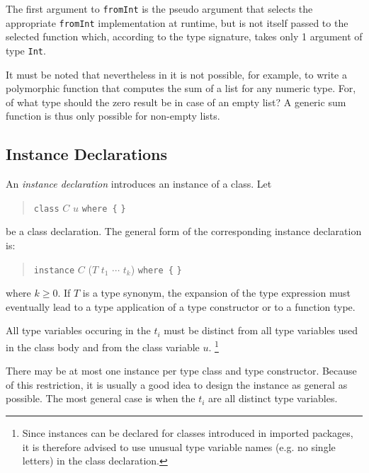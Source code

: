 The first argument to \texttt{fromInt} is the pseudo argument that selects the appropriate \texttt{fromInt} implementation at runtime, but is not itself passed to the selected function which, according to the type signature, takes only 1 argument of type \texttt{Int}.

It must be noted that nevertheless in \frege{} it is not possible, for example, to write a polymorphic function that computes the sum of a list for any numeric type. For, of what type should the zero result be in case of an empty list? A generic sum function is thus only possible for non-empty lists.

\subsection{Instance Declarations} \label{instdcl}  

\begin{flushleft}
    
\end{flushleft}

An \emph{instance declaration} introduces an instance of a class. Let
\begin{quote}
\texttt{class} $C$ $u$ \texttt{where \{}  \texttt{\}}
\end{quote}
be a class declaration.
The general form of the corresponding instance declaration is:
\begin{quote}
\texttt{instance} $C$ ($T$ $t_1$ $\cdots$ $t_k$) \texttt{where \{}  \texttt{\}}
\end{quote}
where $k \ge 0$. If $T$ is a type synonym, the expansion of the type expression must eventually lead to a type application of a type constructor or to a function type.

All type variables occuring in the $t_i$ must be distinct from all type variables used in the class body and from the class variable $u$.
\footnote{Since instances can be declared for classes introduced in imported packages, it is therefore advised to use unusual type variable names (e.g. no single letters) in the class declaration.}

There may be at most one instance per type class and type constructor. Because of this restriction, it is usually a good idea to design the instance as general as possible. The most general case is when the $t_i$ are all distinct type variables.

